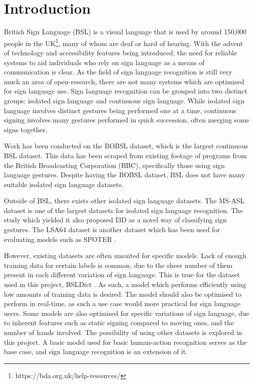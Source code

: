 \documentclass[final,dissertation.tex]{subfiles}
\begin{document}
\chapter{Introduction}

British Sign Language (BSL) is a visual language that is used by around 150,000 people in the UK\footnote{https://bda.org.uk/help-resources/}, many of whom are deaf or hard of hearing. With the advent of technology and accessibility features being introduced, the need for reliable systems to aid individuals who rely on sign language as a means of communication is clear. As the field of sign language recognition is still very much an area of open-research, there are not many systems which are optimised for sign language use. Sign language recognition can be grouped into two distinct groups: isolated sign language and continuous sign language. While isolated sign language involves distinct gestures being performed one at a time, continuous signing involves many gestures performed in quick succession, often merging some signs together.

Work has been conducted on the BOBSL\cite{albanie2021bbc} dataset, which is the largest continuous BSL dataset. This data has been scraped from existing footage of programs from the British Broadcasting Corporation (BBC), specifically those using sign language gestures. Despite having the BOBSL dataset, BSL does not have many suitable isolated sign language datasets.

Outside of BSL, there exists other isolated sign language datasets. The MS-ASL dataset \cite{joze2018ms} is one of the largest datasets for isolated sign language recognition. The study which yielded it also proposed I3D as a novel way of classifying sign gestures. The LSA64 dataset \cite{ronchetti2016lsa64} is another dataset which has been used for evaluating models such as SPOTER \cite{bohavcek2022sign}.

However, existing datasets are often unsuited for specific models.  Lack of enough training data for certain labels is common, due to the sheer number of them present in each different variation of sign language. This is true for the dataset used in this project, BSLDict \cite{momeni2020watch}. As such, a model which performs efficiently using low amounts of training data is desired. The model should also be optimised to perform in real-time, as such a use case would more practical for sign language users. Some models are also optimised for specific variations of sign language, due to inherent features such as static signing compared to moving ones, and the number of hands involved. The possibility of using other datasets is explored in this project. A basic model used for basic human-action recognition serves as the base case, and sign language recognition is an extension of it.
\end{document}
